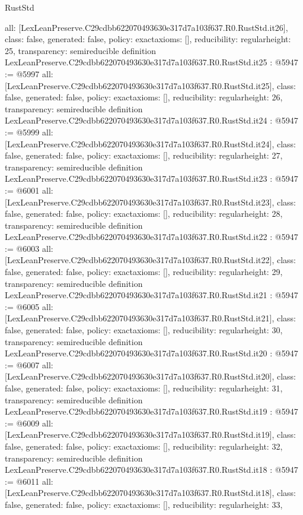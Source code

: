 \begin{lexlean}{RustStd}
\begin{coremodule}
{  all: [LexLeanPreserve.C29cdbb622070493630e317d7a103f637.R0.RustStd.it26],
  class: false,
  generated: false,
  policy: exact{axioms: []},
  reducibility: regular{height: 25},
  transparency: semireducible
}
definition LexLeanPreserve.C29cdbb622070493630e317d7a103f637.R0.RustStd.it25 : @5947 := @5997 {
  all: [LexLeanPreserve.C29cdbb622070493630e317d7a103f637.R0.RustStd.it25],
  class: false,
  generated: false,
  policy: exact{axioms: []},
  reducibility: regular{height: 26},
  transparency: semireducible
}
definition LexLeanPreserve.C29cdbb622070493630e317d7a103f637.R0.RustStd.it24 : @5947 := @5999 {
  all: [LexLeanPreserve.C29cdbb622070493630e317d7a103f637.R0.RustStd.it24],
  class: false,
  generated: false,
  policy: exact{axioms: []},
  reducibility: regular{height: 27},
  transparency: semireducible
}
definition LexLeanPreserve.C29cdbb622070493630e317d7a103f637.R0.RustStd.it23 : @5947 := @6001 {
  all: [LexLeanPreserve.C29cdbb622070493630e317d7a103f637.R0.RustStd.it23],
  class: false,
  generated: false,
  policy: exact{axioms: []},
  reducibility: regular{height: 28},
  transparency: semireducible
}
definition LexLeanPreserve.C29cdbb622070493630e317d7a103f637.R0.RustStd.it22 : @5947 := @6003 {
  all: [LexLeanPreserve.C29cdbb622070493630e317d7a103f637.R0.RustStd.it22],
  class: false,
  generated: false,
  policy: exact{axioms: []},
  reducibility: regular{height: 29},
  transparency: semireducible
}
definition LexLeanPreserve.C29cdbb622070493630e317d7a103f637.R0.RustStd.it21 : @5947 := @6005 {
  all: [LexLeanPreserve.C29cdbb622070493630e317d7a103f637.R0.RustStd.it21],
  class: false,
  generated: false,
  policy: exact{axioms: []},
  reducibility: regular{height: 30},
  transparency: semireducible
}
definition LexLeanPreserve.C29cdbb622070493630e317d7a103f637.R0.RustStd.it20 : @5947 := @6007 {
  all: [LexLeanPreserve.C29cdbb622070493630e317d7a103f637.R0.RustStd.it20],
  class: false,
  generated: false,
  policy: exact{axioms: []},
  reducibility: regular{height: 31},
  transparency: semireducible
}
definition LexLeanPreserve.C29cdbb622070493630e317d7a103f637.R0.RustStd.it19 : @5947 := @6009 {
  all: [LexLeanPreserve.C29cdbb622070493630e317d7a103f637.R0.RustStd.it19],
  class: false,
  generated: false,
  policy: exact{axioms: []},
  reducibility: regular{height: 32},
  transparency: semireducible
}
definition LexLeanPreserve.C29cdbb622070493630e317d7a103f637.R0.RustStd.it18 : @5947 := @6011 {
  all: [LexLeanPreserve.C29cdbb622070493630e317d7a103f637.R0.RustStd.it18],
  class: false,
  generated: false,
  policy: exact{axioms: []},
  reducibility: regular{height: 33},
}
\end{coremodule}
\end{lexlean}
